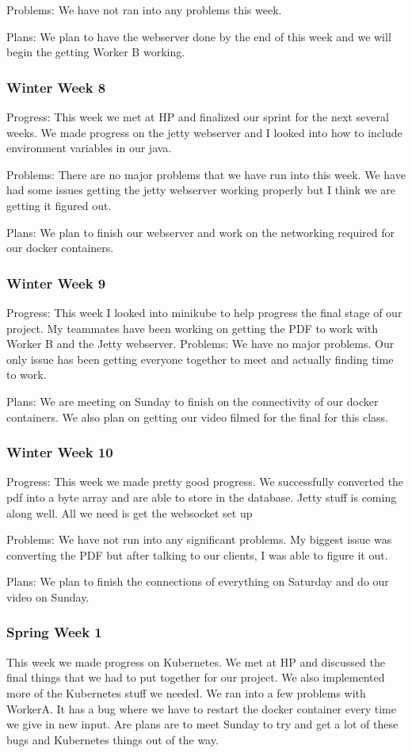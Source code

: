 \documentclass[onecolumn, draftclsnofoot,10pt, compsoc]{IEEEtran}
\begin{document}
Problems: We have not ran into any problems this week.

Plans: We plan to have the webserver done by the end of this week and we will begin the getting Worker B working.
\subsubsection*{Winter Week 8}
Progress: This week we met at HP and finalized our sprint for the next several weeks. We made progress on the jetty webserver and I looked into how to include environment variables in our java.

Problems: There are no major problems that we have run into this week. We have had some issues getting the jetty webserver working properly but I think we are getting it figured out.

Plans: We plan to finish our webserver and work on the networking required for our docker containers.
\subsubsection*{Winter Week 9}

Progress: This week I looked into minikube to help progress the final stage of our project. My teammates have been working on getting the PDF to work with Worker B and the Jetty webserver.
Problems: We have no major problems. Our only issue has been getting everyone together to meet and actually finding time to work.

Plans: We are meeting on Sunday to finish on the connectivity of our docker containers. We also plan on getting our video filmed for the final for this class.

\subsubsection*{Winter Week 10}
Progress: This week we made pretty good progress. We successfully converted the pdf into a byte array and are able to store in the database. Jetty stuff is coming along well. All we need is get the websocket set up 

Problems: We have not run into any significant problems. My biggest issue was converting the PDF but after talking to our clients, I was able to figure it out.

Plans: We plan to finish the connections of everything on Saturday and do our video on Sunday.

\subsubsection*{Spring Week 1}
This week we made progress on Kubernetes. We met at HP and discussed the final things that we had to put together for our project. We also implemented more of the Kubernetes stuff we needed. We ran into a few problems with WorkerA. It has a bug where we have to restart the docker container every time we give in new input. Are plans are to meet Sunday to try and get a lot of these bugs and Kubernetes things out of the way.
\end{document}
